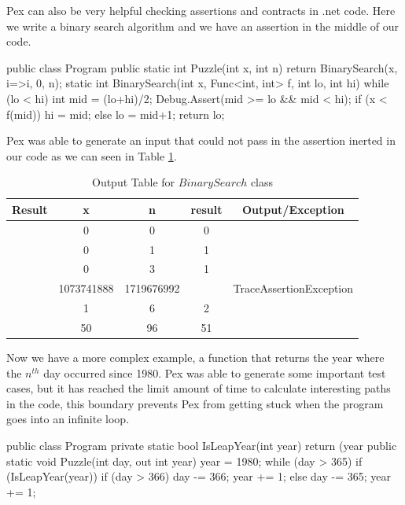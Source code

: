 \documentclass[10pt, conference, compsocconf]{IEEEtran}
\newcommand{\checkK}{\color{ForestGreen}\checkmark}
\newcommand{\cross}{\color{red}\hspace{-3pt}\ding{55}}
\begin{document}
Pex can also be very helpful checking assertions and contracts in .net code. Here we write a binary search algorithm and we have an assertion in
the middle of our code.

\begin{code}
public class Program {
  public static int Puzzle(int x, int n) {
    return BinarySearch(x, i=>i, 0, n);
  }
  static int BinarySearch(int x, Func<int, int> f, int lo, int hi) {
    while (lo < hi) {
      int mid = (lo+hi)/2;
      Debug.Assert(mid >= lo && mid < hi);
      if (x < f(mid)) { hi = mid; } else { lo = mid+1; }
    }
    return lo;
  }
}
\end{code}

Pex was able to generate an input that could not pass in the assertion inerted in our code as we can seen in Table \ref{tab:binary}.

\begin{table}[!ht]
\renewcommand{\arraystretch}{1.3}
\setlength{\tabcolsep}{1pt}
\caption{Output Table for $BinarySearch$ class}
\label{tab:binary}
\centering
\noindent \begin{tabular}{|c|c|c|c|c|}\hline
Result & x & n & result & Output/Exception \\\hline
\checkK & 0 & 0 & 0      & \\\hline
\checkK & 0 & 1 & 1      & \\\hline
\checkK & 0 & 3 & 1      & \\\hline
\cross & 1073741888 & 1719676992 & & TraceAssertionException \\\hline
\checkK & 1 & 6 & 2      & \\\hline
\checkK & 50 & 96 & 51      &\\\hline
\end{tabular}
\end{table}

Now we have a more complex example, a function that returns the year where the $n^{th}$ day occurred since 1980.
Pex was able to generate some important test cases, but it has reached the limit amount of time to calculate interesting paths in the code,
this boundary prevents Pex from getting stuck when the program goes into
an infinite loop.

\begin{code}
public class Program {
  private static bool IsLeapYear(int year) {
    return (year %
  }
  public static void Puzzle(int day, out int year) {
    year = 1980;
    while (day > 365) {
      if (IsLeapYear(year)) {
        if (day > 366) {
          day -= 366;
          year += 1;
        }
      } else {
        day -= 365;
        year += 1;
      }
    }
  }
}
\end{code}
\end{document}
